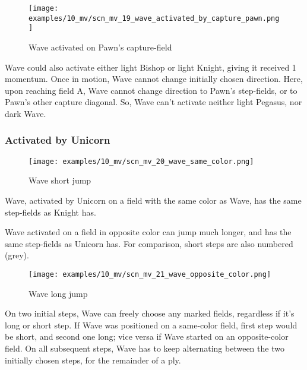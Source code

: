 \vspace*{-2.1\baselineskip}
\noindent
\begin{figure}[!h]
\texttt{[image: examples/10\_mv/scn\_mv\_19\_wave\_activated\_by\_capture\_pawn.png]}
\caption{Wave activated on Pawn's capture-field}
\label{fig:scn_mv_19_wave_activated_by_capture_pawn}
\end{figure}

Wave could also activate either light Bishop or light Knight, giving it received 1 momentum.
Once in motion, Wave cannot change initially chosen direction. Here, upon reaching field A,
Wave cannot change direction to Pawn's step-fields, or to Pawn's other capture diagonal. So,
Wave can't activate neither light Pegasus, nor dark Wave.

\clearpage %

\subsubsection*{Activated by Unicorn}
\label{sec:Miranda's veil/Wave/Movement/Activated by Unicorn}

\vspace*{-0.7\baselineskip}
\noindent
\begin{wrapfigure}[10]{l}{0.45\textwidth}
\centering
\texttt{[image: examples/10\_mv/scn\_mv\_20\_wave\_same\_color.png]}
\vspace*{-0.3\baselineskip}
\caption{Wave short jump}
\label{fig:scn_mv_20_wave_same_color}
\end{wrapfigure}
Wave, activated by Unicorn on a field with the same color as Wave, has the same step-fields
as Knight has.

Wave activated on a field in opposite color can jump much longer, and has the same step-fields
as Unicorn has. For comparison, short steps are also numbered (grey).

\vspace*{0.7\baselineskip}
\noindent
\begin{wrapfigure}[18]{l}{0.7\textwidth}
\centering
\texttt{[image: examples/10\_mv/scn\_mv\_21\_wave\_opposite\_color.png]}
\vspace*{-0.3\baselineskip}
\caption{Wave long jump}
\label{fig:scn_mv_21_wave_opposite_color}
\end{wrapfigure}
On two initial steps, Wave can freely choose any marked fields, regardless if it's long or short step.
If Wave was positioned on a same-color field, first step would be short, and second one long; vice versa
if Wave started on an opposite-color field. On all subsequent steps, Wave has to keep alternating between
the two initially chosen steps, for the remainder of a ply.

